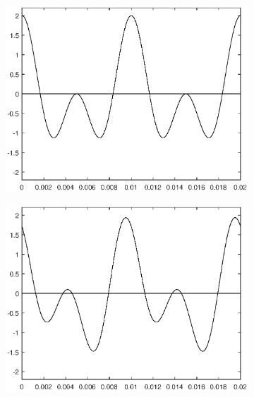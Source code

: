 \documentclass[11pt,a4paper]{article}
\begin{document}
\begin{figure}[htbp]
\centering
\begin{subfigure}{0.48\textwidth}
\includegraphics[scale=0.5]{phase_000}
\end{subfigure}
\begin{subfigure}{0.48\textwidth}
\includegraphics[scale=0.5]{phase_045}
\end{subfigure}
\begin{subfigure}{0.48\textwidth}

\end{subfigure}
\end{figure}
\end{document}
